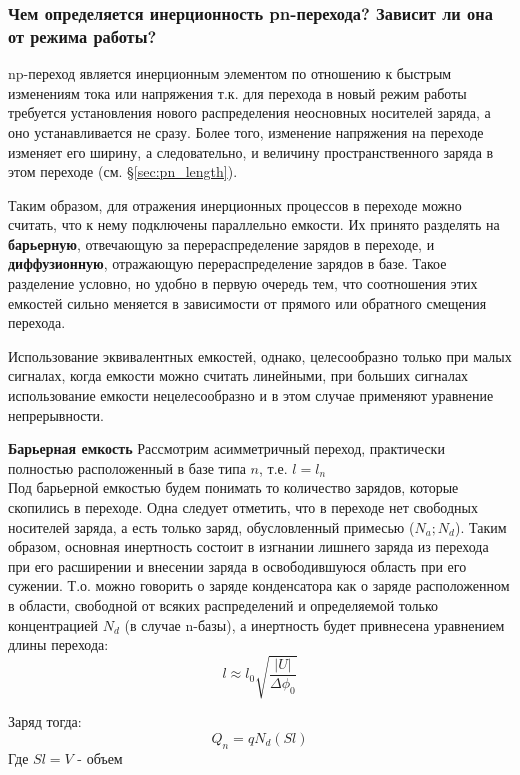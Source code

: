 \subsubsection{Чем определяется инерционность pn-перехода? Зависит ли она от режима работы?}
np-переход является инерционным элементом по отношению к быстрым изменениям тока или напряжения т.к. для перехода в новый режим работы требуется установления нового распределения неосновных носителей заряда, а оно устанавливается не сразу. Более того, изменение напряжения на переходе изменяет его ширину, а следовательно, и величину пространственного заряда в этом переходе (см. \S \ref{sec:pn_length}).


Таким образом, для отражения инерционных процессов в переходе можно считать, что к нему подключены параллельно емкости. Их принято разделять на \textbf{барьерную}, отвечающую за перераспределение зарядов в переходе, и \textbf{диффузионную}, отражающую перераспределение зарядов в базе.
Такое разделение условно, но удобно в первую очередь тем, что соотношения этих емкостей сильно меняется в зависимости от прямого или обратного смещения перехода.


Использование эквивалентных емкостей, однако, целесообразно только при малых сигналах, когда емкости можно считать линейными, при больших сигналах использование емкости нецелесообразно и в этом случае применяют уравнение непрерывности.

\textbf{Барьерная емкость}
Рассмотрим асимметричный переход, практически полностью расположенный в базе типа $n$, т.е. $l = l_n$\\
Под барьерной емкостью будем понимать то количество зарядов, которые скопились в переходе. Одна следует отметить, что в переходе нет свободных носителей заряда, а есть только заряд, обусловленный примесью ($N_a; N_d$). Таким образом, основная инертность состоит в изгнании лишнего заряда из перехода при его расширении и внесении заряда в освободившуюся область при его сужении. Т.о. можно говорить о заряде конденсатора как о заряде расположенном в области, свободной от всяких распределений и определяемой только концентрацией $N_d$ (в случае n-базы), а инертность будет привнесена уравнением длины перехода:
\begin{equation}
l \approx l_0 \sqrt{\frac{|U|}{\Delta \phi_0}}
\end{equation}

Заряд тогда:
\begin{equation}
Q_n = q N_d (S l)
\end{equation}
Где $S l = V$ - объем\\

